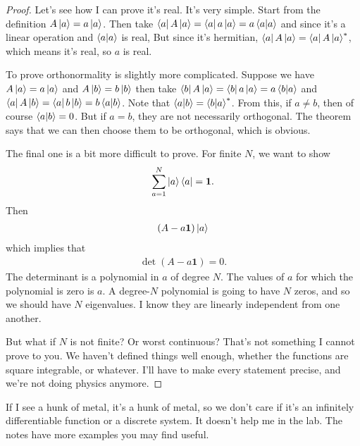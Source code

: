 \begin{proof}
    Let's see how I can prove it's real.
    It's very simple.
    Start from the definition
    $A\ket{a} = a\ket{a}$.
    Then take
    $\bra{a}A\ket{a} = \bra{a}a\ket{a} = a\braket{a}{a}$
    and since it's a linear operation and $\braket{a}{a}$ is real,
    But since it's hermitian,
    $\bra{a}A\ket{a} = \bra{a}A\ket{a}^*$,
    which means it's real,
    so $a$ is real.

    To prove orthonormality is slightly more complicated.
    Suppose we have
    $A\ket{a} = a\ket{a}$
    and
    $A\ket{b} = b\ket{b}$
    then take
    $\bra{b}A\ket{a} = \bra{b}a\ket{a} = a\braket{b}{a}$
    and
    $\bra{a}A\ket{b} = \bra{a}b\ket{b} = b \braket{a}{b}$.
    Note that $\braket{a}{b} = \braket{b}{a}^*$.
    From this,
    if $a\ne b$,
    then of course
    $\braket{a}{b}=0$.
    But if $a=b$,
    they are not necessarily orthogonal.
    The theorem says that we can then choose them to be orthogonal,
    which is obvious.

    The final one is a bit more difficult to prove.
    For finite $N$,
    we want to show
    \begin{align}
        \sum_{a=1}^{N}\ket{a}\bra{a} = \mathbf{1}.
    \end{align}
    Then
    \begin{align}
        (A - a\mathbf{1})\ket{a}
    \end{align}
    which implies that
    \begin{align}
        \det(A - a\mathbf{1}) = 0.
    \end{align}
    The determinant is a polynomial in $a$ of degree $N$.
    The values of $a$ for which the polynomial is zero is $a$.
    A degree-$N$ polynomial is going to have $N$ zeros,
    and so we should have $N$ eigenvalues.
    I know they are linearly independent from one another.

    But what if $N$ is not finite?
    Or worst continuous?
    That's not something I cannot prove to you.
    We haven't defined things well enough,
    whether the functions are square integrable,
    or whatever.
    I'll have to make every statement precise,
    and we're not doing physics anymore.
\end{proof}

If I see a hunk of metal,
it's a hunk of metal,
so we don't care if it's an infinitely differentiable function or a discrete
system.
It doesn't help me in the lab.
The notes have more examples you may find useful.

